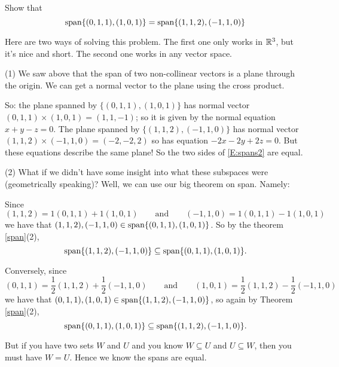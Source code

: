 \begin{myprob} Show that
\begin{equation}\label{E:spans2}
\textrm{span}\{ (0,1,1),(1,0,1)\} = \textrm{span}\{ (1,1,2), (-1,1,0)\}
\end{equation}

\begin{mysol} Here are two ways of solving this problem. The first one
only works in $\mathbb{R}^3$, but it's nice and short.  The second one
works in any vector space.

(1) We saw above that the span of two non-collinear vectors is
a plane through the origin.  We can get a normal vector to the
plane using the cross product.  

So:  the plane spanned by $\{ (0,1,1),(1,0,1)\}$ has normal 
vector $(0,1,1)\times(1,0,1) = (1,1,-1)$; so it is given
by the normal equation $x+y-z=0$.  The plane spanned by 
$\{ (1,1,2), (-1,1,0)\}$ has normal vector $ (1,1,2)\times (-1,1,0)=(-2,-2,2)$
so has equation $-2x-2y+2z=0$.  But these equations describe the same
plane!  So the two sides of \eqref{E:spans2} are equal.

(2) What if we didn't have some insight into what these subspaces
were (geometrically speaking)?  Well, we can use our big theorem
on span.  Namely:

Since 
$$
(1,1,2) = 1(0,1,1)+1(1,0,1) \qquad \textrm{and}\qquad 
(-1,1,0) = 1(0,1,1)-1(1,0,1)
$$
we have that $(1,1,2), (-1,1,0) \in \textrm{span}\{(0,1,1),(1,0,1)\}$.
So by the theorem \ref{span}(2), $$\textrm{span}\{(1,1,2), (-1,1,0) \} \subseteq \textrm{span}\{(0,1,1),(1,0,1)\}.$$

Conversely, since
$$
(0,1,1) = \frac12(1,1,2) + \frac12(-1,1,0) \qquad \textrm{and}\qquad 
(1,0,1) = \frac12(1,1,2) - \frac12(-1,1,0)
$$
we have that $(0,1,1),(1,0,1) \in \textrm{span}\{(1,1,2), (-1,1,0) \}$, so again by
Theorem \ref{span}(2), $$\textrm{span}\{(0,1,1),(1,0,1)\}\subseteq \textrm{span}\{(1,1,2), (-1,1,0) \}.$$

But if you have two sets $W$ and $U$ and you know $W \subseteq U$
and $U \subseteq W$, then you must have $W = U$.  Hence we know
the spans are equal.
\end{mysol}\end{myprob}



